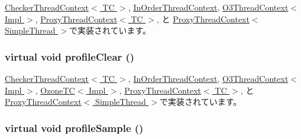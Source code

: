 \hyperlink{classCheckerThreadContext_a6005386aeeaecb35499c3199fb47ba2f}{CheckerThreadContext$<$ TC $>$}, \hyperlink{classInOrderThreadContext_a6005386aeeaecb35499c3199fb47ba2f}{InOrderThreadContext}, \hyperlink{classO3ThreadContext_a6005386aeeaecb35499c3199fb47ba2f}{O3ThreadContext$<$ Impl $>$}, \hyperlink{classProxyThreadContext_a6005386aeeaecb35499c3199fb47ba2f}{ProxyThreadContext$<$ TC $>$}, と \hyperlink{classProxyThreadContext_a6005386aeeaecb35499c3199fb47ba2f}{ProxyThreadContext$<$ SimpleThread $>$}で実装されています。\hypertarget{classThreadContext_ac9ebb698bd789f38c55af10256aab7e8}{
\subsubsection[{profileClear}]{\setlength{\rightskip}{0pt plus 5cm}virtual void profileClear ()}}
\label{classThreadContext_ac9ebb698bd789f38c55af10256aab7e8}


\hyperlink{classCheckerThreadContext_acf9c88860776d7bd752317e8b550a5d5}{CheckerThreadContext$<$ TC $>$}, \hyperlink{classInOrderThreadContext_acf9c88860776d7bd752317e8b550a5d5}{InOrderThreadContext}, \hyperlink{classO3ThreadContext_acf9c88860776d7bd752317e8b550a5d5}{O3ThreadContext$<$ Impl $>$}, \hyperlink{classOzoneCPU_1_1OzoneTC_acf9c88860776d7bd752317e8b550a5d5}{OzoneTC$<$ Impl $>$}, \hyperlink{classProxyThreadContext_acf9c88860776d7bd752317e8b550a5d5}{ProxyThreadContext$<$ TC $>$}, と \hyperlink{classProxyThreadContext_acf9c88860776d7bd752317e8b550a5d5}{ProxyThreadContext$<$ SimpleThread $>$}で実装されています。\hypertarget{classThreadContext_a46e9ef08695527c8b4bd0e668bced5a8}{
\subsubsection[{profileSample}]{\setlength{\rightskip}{0pt plus 5cm}virtual void profileSample ()}}
\label{classThreadContext_a46e9ef08695527c8b4bd0e668bced5a8}


